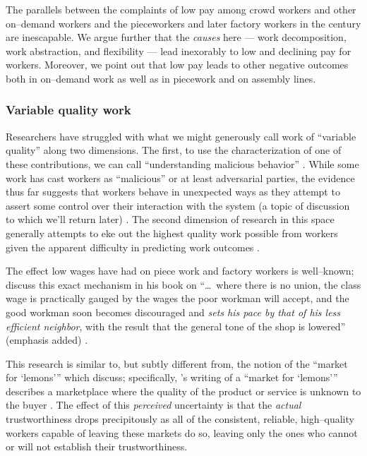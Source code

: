 \documentclass[trackingWork]{subfiles}
\begin{document}
{\begin{appendices}
    The parallels between the complaints of low pay among crowd workers and other on--demand workers
    and the pieceworkers and later factory workers in the  century
    are inescapable.
    We argue further that the \textit{causes} here
    --- work decomposition,
    work abstraction, and
    flexibility ---
    lead inexorably to low and declining pay for workers.
    Moreover, we point out that low pay leads to other negative outcomes both
    in on--demand work
    as well as
    in piecework and on assembly lines.

    \subsubsection{Variable quality work}\label{sec:varQualWork}
    Researchers have struggled with what we might generously call work of ``variable quality''
    along two dimensions.
    The first, to use the characterization of one of these contributions, we can call
    ``understanding malicious behavior''
    \cite{MaliciousCrowdworkersGadiraju}.
    While some work has cast workers as ``malicious'' or at least adversarial parties,
    the evidence thus far suggests that
    workers behave in unexpected ways as they attempt to assert some control over their interaction with the system
    (a topic of discussion to which we'll return later)
    \cite{uberAlgorithm}.
    The second dimension of research in this space generally attempts
    to eke out the highest quality work possible from workers
    given the apparent difficulty in predicting work outcomes
    \cite{embracingErrorKrishna}.






    The effect low wages have had on piece work and factory workers is well--known;
    \citeauthor{gantt1913work} discuss this exact mechanism in his book on
    ``\dots~where there is no union,
    the class wage is practically gauged by the wages the poor workman will accept,
    and the good workman soon becomes discouraged and \textit{sets his pace by that of his less efficient neighbor},
    with the result that the general tone of the shop is lowered'' (emphasis added)
    \cite{gantt1913work}.

    This research is similar to, but subtly different from, the notion of the ``market for `lemons'''
    which \citeauthor{fort2011amazon} discuss;
    specifically, \citeauthor{akerlof1970market}'s writing of a ``market for `lemons'''
    describes a marketplace where the quality of the product or service is unknown to the buyer
    \cite{fort2011amazon,akerlof1970market}.
    The effect of this \textit{perceived} uncertainty is that
    the \textit{actual} trustworthiness drops precipitously
    as all of the consistent, reliable, high--quality workers capable of leaving these markets do so,
    leaving only the ones who cannot or will not establish their trustworthiness.


\end{appendices}}
\end{document}
